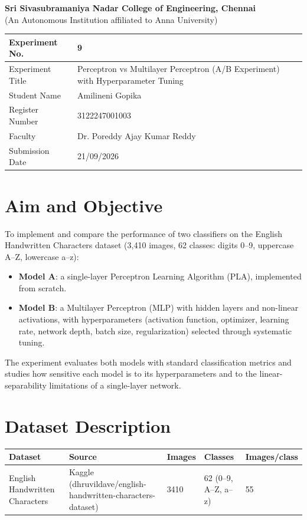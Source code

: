 \documentclass[12pt,a4paper]{article}
\begin{document}
\begin{center}
{\large \textbf{Sri Sivasubramaniya Nadar College of Engineering, Chennai}}\\
{\small (An Autonomous Institution affiliated to Anna University)}
\end{center}
\vspace{0.3cm}

\begin{tabular}{|p{4cm}|p{11cm}|}
\hline
Experiment No. & 9 \\ \hline
Experiment Title & Perceptron vs Multilayer Perceptron (A/B Experiment) with Hyperparameter Tuning \\ \hline
Student Name & Amilineni Gopika  \\ \hline
Register Number & 3122247001003 \\ \hline
Faculty & Dr. Poreddy Ajay Kumar Reddy \\ \hline
Submission Date & 21/09/2026 \\ \hline
\end{tabular}

\section{Aim and Objective}
To implement and compare the performance of two classifiers on the English Handwritten Characters
dataset (3{,}410 images, 62 classes: digits 0--9, uppercase A--Z, lowercase a--z):
\begin{itemize}
\item \textbf{Model A}: a single-layer Perceptron Learning Algorithm (PLA), implemented from scratch.
\item \textbf{Model B}: a Multilayer Perceptron (MLP) with hidden layers and non-linear activations,
with hyperparameters (activation function, optimizer, learning rate, network depth, batch size,
regularization) selected through systematic tuning.
\end{itemize}
The experiment evaluates both models with standard classification metrics and studies how sensitive
each model is to its hyperparameters and to the linear-separability limitations of a single-layer
network.

\section{Dataset Description}
\begin{longtable}{|p{4cm}|p{5cm}|p{1.6cm}|p{1.8cm}|p{2.2cm}|}
\hline
\textbf{Dataset} & \textbf{Source} & \textbf{Images} & \textbf{Classes} & \textbf{Images/class} \\ \hline
English Handwritten Characters & Kaggle (dhruvildave/english-handwritten-characters-dataset) & 3410 & 62 (0--9, A--Z, a--z) & 55 \\ \hline
\end{longtable}
\end{document}
